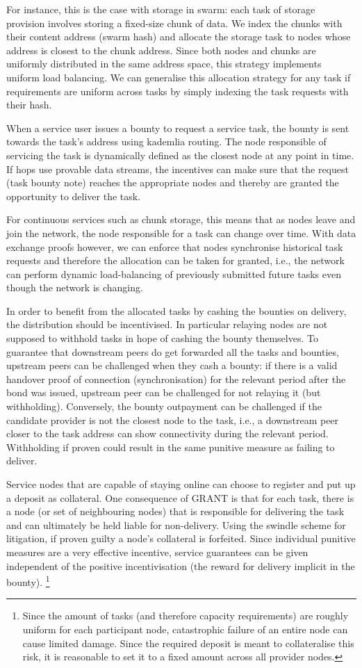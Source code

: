 \documentclass[a4paper,10pt]{article}
\begin{document}
For instance, this is the case with storage in swarm:
each task of storage provision involves storing a fixed-size chunk of data.
We index the chunks with their content address (swarm hash) and allocate the storage task
to nodes whose address is closest to the chunk address.
Since both nodes and chunks are uniformly distributed in the same address space,
this strategy implements uniform load balancing. We can generalise this allocation
strategy for any task if requirements
are uniform across tasks by simply indexing the task requests with their hash.

When a service user issues a bounty to request a service task, the bounty
is sent towards the task's address using kademlia routing.
The node responsible of servicing the task is dynamically defined as the closest node at any point in time.
If hops use provable data streams, the incentives can make sure that the request (task bounty note) reaches the appropriate nodes and thereby are granted the opportunity to deliver the task.

For continuous services such as chunk storage, this means that as nodes leave
and join the network, the node responsible for a task can change over time.
With data exchange proofs however, we can enforce that nodes synchronise historical
task requests and therefore the allocation can be taken for granted, i.e., the network
can perform dynamic load-balancing of previously submitted future tasks even though
the network is changing.

In order to benefit from the allocated tasks by cashing the bounties on delivery, the distribution
should be incentivised. In particular relaying nodes are not supposed to withhold
tasks in hope of cashing the bounty themselves.
To guarantee that downstream peers do get forwarded all the tasks and bounties,
upstream peers can be challenged when they cash a bounty:
if there is a valid handover proof of connection (synchronisation)
for the relevant period after the bond was issued, upstream peer can be challenged
for not relaying it (but withholding). Conversely, the bounty outpayment can be challenged
if the candidate provider is not the closest node to the task, i.e., a downstream peer closer to
the task address can show connectivity during the relevant period. Withholding if proven could
result in the same punitive measure as failing to deliver.


Service nodes that are capable of staying online can choose to register
and put up a deposit as collateral.
One consequence of GRANT is that for each task, there is a node (or set of neighbouring nodes)
that is responsible for delivering the task and can ultimately be held liable
for non-delivery. Using the swindle scheme for litigation, if proven guilty a node's
collateral is forfeited.
Since individual punitive measures are a very
effective incentive, service guarantees can be given independent of the
positive incentivisation (the reward for delivery implicit in the bounty).%
%
\footnote{Since the amount of tasks (and therefore capacity requirements) are roughly uniform for each
participant node, catastrophic failure of an entire node can cause limited damage.
Since the required deposit is meant to collateralise this risk, it is reasonable to
set it to a fixed amount across all provider nodes.}
\end{document}
